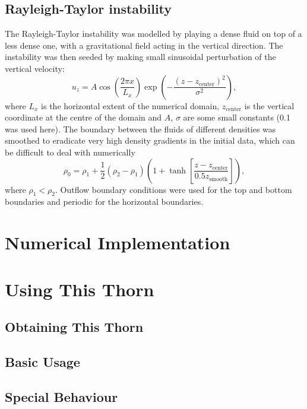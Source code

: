 \subsection{Rayleigh-Taylor instability}
\label{sec:Rayleigh-Taylor}
The Rayleigh-Taylor instability was modelled by playing a dense fluid on top of a less dense one, with a gravitational field acting in the vertical direction. The instability was then seeded by making small sinusoidal perturbation of the vertical velocity:
\begin{equation}
u_z = A \cos\left(\frac{2\pi x}{L_x}\right) \exp\left(-\frac{(z-z_\text{center})^2}{\sigma^2}\right),
\end{equation}
where \(L_x\) is the horizontal extent of the numerical domain, \(z_\text{center}\) is the vertical coordinate at the centre of the domain and \(A\), \(\sigma\) are some small constants (0.1 was used here). The boundary between the fluids of different densities was smoothed to eradicate very high density gradients in the initial data, which can be difficult to deal with numerically
\begin{equation}
\rho_0 = \rho_1 + \frac{1}{2}(\rho_2 - \rho_1)\left(1 + \tanh\left[\frac{z - z_\text{center}}{0.5z_\text{smooth}}\right]\right),
\end{equation}
where \(\rho_1 < \rho_2\).
Outflow boundary conditions were used for the top and bottom boundaries and periodic for the horizontal boundaries. 

\section{Numerical Implementation}

\section{Using This Thorn}

\subsection{Obtaining This Thorn}

\subsection{Basic Usage}

\subsection{Special Behaviour}

